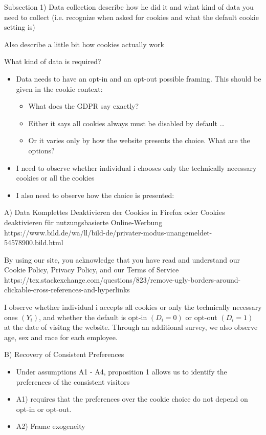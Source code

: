 Subsection 1) Data collection
describe how he did it and what kind of data you need to collect (i.e. recognize when asked for cookies and what the default cookie setting is)

Also describe a little bit how cookies actually work

What kind of data is required?




\begin{itemize}
    \item Data needs to have an opt-in and an opt-out possible framing. This should be given in the cookie context: 
    \begin{itemize}
        \item What does the GDPR say exactly?
        \item Either it says all cookies always must be disabled by default \dots 
        \item Or it varies only by how the website presents the choice. What are the options? 
    \end{itemize}
    \item I need to observe whether individual i chooses only the technically necessary cookies or all the cookies
    \item I also need to observe how the choice is presented: 
\end{itemize}

A) Data
Komplettes Deaktivieren der Cookies in Firefox oder Cookies deaktivieren für nutzungsbasierte Online-Werbung
https://www.bild.de/wa/ll/bild-de/privater-modus-unangemeldet-54578900.bild.html

By using our site, you acknowledge that you have read and understand our Cookie Policy, Privacy Policy, and our Terms of Service
https://tex.stackexchange.com/questions/823/remove-ugly-borders-around-clickable-cross-references-and-hyperlinks

I observe whether individual i accepts all cookies or only the technically necessary ones $(Y_{i})$, and whether the default is opt-in $ (D_{i} = 0) $ or opt-out $ (D_{i} = 1) $ at the date of visitng the website. 
Through an additional survey, we also observe age, sex and race for each employee.

B) Recovery of Consistent Preferences

\begin{itemize}
    \item Under assumptions A1 - A4, proposition 1 allows us to identify the preferences of the consistent visitors
    \item A1) requires that the preferences over the cookie choice do not depend on opt-in or opt-out.
    \item A2) Frame exogeneity
\end{itemize}

